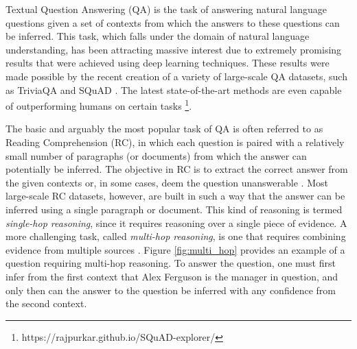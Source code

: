 \documentclass[11pt,a4paper,dvipsnames]{article}
\begin{document}
Textual Question Answering (QA) is the task of answering natural language questions given a set of contexts from which the answers to these questions can be inferred. This task, which falls under the domain of natural language understanding, has been attracting massive interest due to extremely promising results that were achieved using deep learning techniques. These results were made possible by the recent creation of a variety of large-scale QA datasets, such as TriviaQA \citep{JoshiCWZ17triviaqa} and SQuAD \citep{RajpurkarZLL16squad}. The latest state-of-the-art methods are even capable of outperforming humans on certain tasks \citep{bert}\footnote{https://rajpurkar.github.io/SQuAD-explorer/}. \par
The basic and arguably the most popular task of QA is often referred to as Reading Comprehension (RC), in which each question is paired with a relatively small number of paragraphs (or documents) from which the answer can potentially be inferred. The objective in RC is to extract the correct answer from the given contexts or, in some cases, deem the question unanswerable \citep{squad2.0}. Most large-scale RC datasets, however,  are built in such a way that the answer can be inferred using a single paragraph or document. This kind of reasoning is termed \emph{single-hop reasoning}, since it requires reasoning over a single piece of evidence. A more challenging task, called \emph{multi-hop reasoning}, is one that requires combining evidence from multiple sources \cite{TalmorB18complexwebquestions, WelblSR18wikihop, Yang0ZBCSM18hotpot}. Figure \ref{fig:multi_hop} provides an example of a question requiring multi-hop reasoning. To answer the question, one must first infer from the first context that Alex Ferguson is the manager in question, and only then can the answer to the question be inferred with any confidence  from the second context. \par
\end{document}
